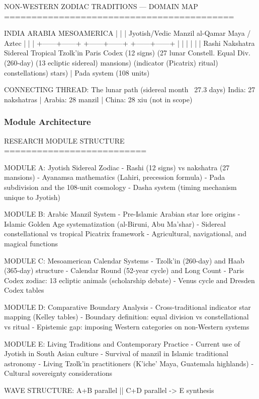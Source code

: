 \documentclass[11pt,letterpaper]{article}
\begin{document}
\begin{asciibox}
NON-WESTERN ZODIAC TRADITIONS — DOMAIN MAP
==========================================

        INDIA                    ARABIA                MESOAMERICA
          |                        |                        |
     Jyotish/Vedic            Manzil al-Qamar         Maya / Aztec
          |                        |                        |
   +------+------+          +------+------+          +------+------+
   |             |          |             |          |             |
 Rashi        Nakshatra   Sidereal     Tropical    Tzolk'in    Paris Codex
 (12 signs)   (27 lunar    Constell.   Equal Div.  (260-day)   (13 ecliptic
  sidereal)    mansions)   (indicator  (Picatrix)  ritual)     constellations)
                           stars)
                |
             Pada system
             (108 units)

CONNECTING THREAD: The lunar path (sidereal month ~27.3 days)
  India: 27 nakshatras | Arabia: 28 manzil | China: 28 xiu (not in scope)
\end{asciibox}

\subsubsection{Module Architecture}

\begin{asciibox}
RESEARCH MODULE STRUCTURE
==========================

MODULE A: Jyotish Sidereal Zodiac
  - Rashi (12 signs) vs nakshatra (27 mansions)
  - Ayanamsa mathematics (Lahiri, precession formula)
  - Pada subdivision and the 108-unit cosmology
  - Dasha system (timing mechanism unique to Jyotish)

MODULE B: Arabic Manzil System
  - Pre-Islamic Arabian star lore origins
  - Islamic Golden Age systematization (al-Biruni, Abu Ma'shar)
  - Sidereal constellational vs tropical Picatrix framework
  - Agricultural, navigational, and magical functions

MODULE C: Mesoamerican Calendar Systems
  - Tzolk'in (260-day) and Haab (365-day) structure
  - Calendar Round (52-year cycle) and Long Count
  - Paris Codex zodiac: 13 ecliptic animals (scholarship debate)
  - Venus cycle and Dresden Codex tables

MODULE D: Comparative Boundary Analysis
  - Cross-traditional indicator star mapping (Kelley tables)
  - Boundary definition: equal division vs constellational vs ritual
  - Epistemic gap: imposing Western categories on non-Western systems

MODULE E: Living Traditions and Contemporary Practice
  - Current use of Jyotish in South Asian culture
  - Survival of manzil in Islamic traditional astronomy
  - Living Tzolk'in practitioners (K'iche' Maya, Guatemala highlands)
  - Cultural sovereignty considerations

WAVE STRUCTURE: A+B parallel || C+D parallel -> E synthesis
\end{asciibox}
\end{document}
